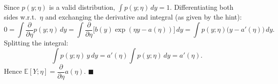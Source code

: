 \begin{answer}
Since $p(y;\eta)$ is a valid distribution, $\int p(y;\eta)\,dy = 1$. Differentiating both sides w.r.t.\ $\eta$ and exchanging the derivative and integral (as given by the hint):
\[
0 = \int \frac{\partial}{\partial\eta} p(y;\eta)\,dy
 = \int \frac{\partial}{\partial\eta}\bigl[b(y)\exp(\eta y - a(\eta))\bigr]\,dy
 = \int p(y;\eta)\bigl(y - a'(\eta)\bigr)\,dy.
\]
Splitting the integral:
\[
\int p(y;\eta)\,y\,dy = a'(\eta)\int p(y;\eta)\,dy = a'(\eta).
\]
Hence $\mathbb{E}[Y;\eta] = \dfrac{\partial}{\partial\eta}a(\eta)$. $\blacksquare$
\end{answer}
